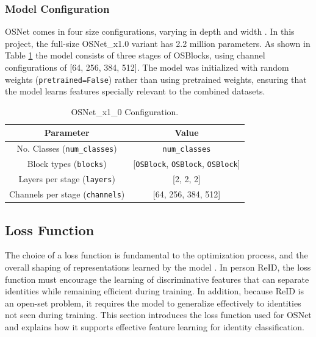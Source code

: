 \subsubsection{Model Configuration}

\acs{OSNet} comes in four size configurations, varying in depth and width \cite{OSNet}. In this project, the full-size \acs{OSNet}\_x1.0 variant has 2.2 million parameters. As shown in Table \ref{tab:osnet-config} the model consists of three stages of \acs{OSBlock}s, using channel configurations of [64, 256, 384, 512]. The model was initialized with random weights (\texttt{pretrained=False}) rather than using pretrained weights, ensuring that the model learns features specially relevant to the combined datasets.

\begin{table}[H]
    \centering
    \begin{tabular}{|c|c|}\hline
        \cellcolor[HTML]{D8E9F7} \textbf{Parameter} & \cellcolor[HTML]{D8E9F7} \textbf{Value} \\\hline
        No. Classes (\texttt{num\_classes}) & \texttt{num\_classes} \\\hline
        Block types (\texttt{blocks})             & [\texttt{OSBlock}, \texttt{OSBlock}, \texttt{OSBlock}] \\\hline
        Layers per stage (\texttt{layers})        & [2, 2, 2] \\\hline
        Channels per stage (\texttt{channels})    & [64, 256, 384, 512] \\\hline
    \end{tabular}
        \caption{\acs{OSNet}\_x1\_0 Configuration.}
    \label{tab:osnet-config}
\end{table}

\subsection{Loss Function}\label{sec:reidloss}
The choice of a loss function is fundamental to the optimization process, and the overall shaping of representations learned by the model \cite{lossfunction}. In person \acs{ReID}, the loss function must encourage the learning of discriminative features that can separate identities while remaining efficient during training. In addition, because \acs{ReID} is an open-set problem, it requires the model to generalize effectively to identities not seen during training. This section introduces the loss function used for \acs{OSNet} and explains how it supports effective feature learning for identity classification.

